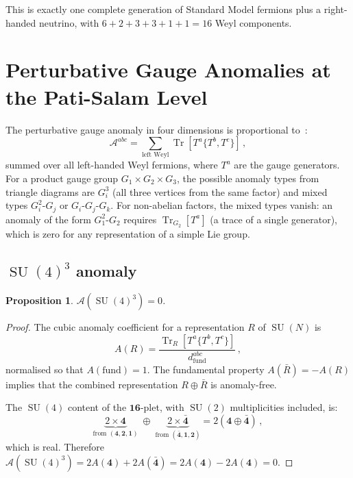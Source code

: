 \documentclass[12pt,a4paper]{article}
\newtheorem{proposition}[theorem]{Proposition}
\theoremstyle{definition}
\newcommand{\Tr}{\operatorname{Tr}}
\newcommand{\SU}{\operatorname{SU}}
\begin{document}
This is exactly one complete generation of Standard Model fermions plus a right-handed neutrino, with $6 + 2 + 3 + 3 + 1 + 1 = 16$ Weyl components.


\section{Perturbative Gauge Anomalies at the Pati-Salam Level}
\label{sec:PS_anomalies}

The perturbative gauge anomaly in four dimensions is proportional to~\cite{ABJ1969,GrossJackiw1972}:
\begin{equation}
\label{eq:anomaly_coeff}
\mathcal{A}^{abc} = \sum_{\text{left Weyl}} \Tr\!\left[T^a \{T^b, T^c\}\right]\,,
\end{equation}
summed over all left-handed Weyl fermions, where $T^a$ are the gauge generators.
For a product gauge group $G_1 \times G_2 \times G_3$, the possible anomaly types from triangle diagrams are $G_i^3$ (all three vertices from the same factor) and mixed types $G_i^2\text{-}G_j$ or $G_i\text{-}G_j\text{-}G_k$.
For non-abelian factors, the mixed types vanish: an anomaly of the form $G_1^2\text{-}G_2$ requires $\Tr_{G_2}[T^a]$ (a trace of a single generator), which is zero for any representation of a simple Lie group.

\subsection{\texorpdfstring{$\SU(4)^3$}{SU(4)³} anomaly}

\begin{proposition}
\label{prop:su4_anomaly}
$\mathcal{A}(\SU(4)^3) = 0$.
\end{proposition}

\begin{proof}
The cubic anomaly coefficient for a representation $R$ of $\SU(N)$ is
\[
A(R) = \frac{\Tr_R[T^a \{T^b, T^c\}]}{d^{abc}_{\mathrm{fund}}}\,,
\]
normalised so that $A(\mathrm{fund}) = 1$.
The fundamental property $A(\bar{R}) = -A(R)$ implies that the combined representation $R \oplus \bar{R}$ is anomaly-free.

The $\SU(4)$ content of the $\mathbf{16}$-plet, with $\SU(2)$ multiplicities included, is:
\begin{equation}
\underbrace{2 \times \mathbf{4}}_{\text{from }(\mathbf{4},\mathbf{2},\mathbf{1})} \;\oplus\; \underbrace{2 \times \bar{\mathbf{4}}}_{\text{from }(\bar{\mathbf{4}},\mathbf{1},\mathbf{2})} = 2(\mathbf{4} \oplus \bar{\mathbf{4}})\,,
\end{equation}
which is real.
Therefore $\mathcal{A}(\SU(4)^3) = 2A(\mathbf{4}) + 2A(\bar{\mathbf{4}}) = 2A(\mathbf{4}) - 2A(\mathbf{4}) = 0$.
\end{proof}
\end{document}
